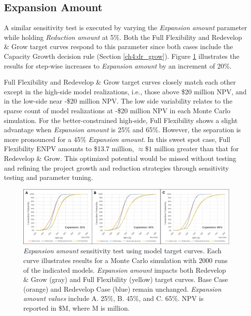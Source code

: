 \subsection{Expansion Amount}
\label{ch6:sens_expamt}

A similar sensitivity test is executed by varying the \textit{Expansion amount} parameter while holding \textit{Reduction amount} at 5\%. Both the Full Flexibility and Redevelop \& Grow target curves respond to this parameter since both cases include the Capacity Growth decision rule (Section \ref{ch4:dr_grow}). Figure \ref{fig:sens_test_expansion} illustrates the results for step-wise increases to \textit{Expansion amount} by an increment of 20\%. 

Full Flexibility and Redevelop \& Grow target curves closely match each other except in the high-side model realizations, i.e., those above \$20 million NPV, and in the low-side near -\$20 million NPV. The low side variability relates to the sparse count of model realizations at -\$20 million NPV in each Monte Carlo simulation. For the better-constrained high-side, Full Flexibility shows a slight advantage when \textit{Expansion amount} is 25\% and 65\%. However, the separation is more pronounced for a 45\% \textit{Expansion amount}. In this sweet spot case, Full Flexibility ENPV amounts to \$13.7 million, $\approx\$1$ million greater than that for Redevelop \& Grow. This optimized potential would be missed without testing and refining the project growth and reduction strategies through sensitivity testing and parameter tuning.

\begin{figure}[!htp]
\centering
\includegraphics[width=.98\textwidth]{templates/images/Figure-Sensitivity_Expansion_Amount.png}
\caption[Expansion Amount sensitivity test]{\textit{Expansion amount} sensitivity test using model target curves. Each curve illustrates results for a Monte Carlo simulation with 2000 runs of the indicated models. \textit{Expansion amount} impacts both Redevelop \& Grow (gray) and Full Flexibility (yellow) target curves. Base Case (orange) and Redevelop Case (blue) remain unchanged. \textit{Expansion amount values} include A. 25\%, B. 45\%, and C. 65\%. NPV is reported in \$M, where M is million.}
\label{fig:sens_test_expansion}
\end{figure}

